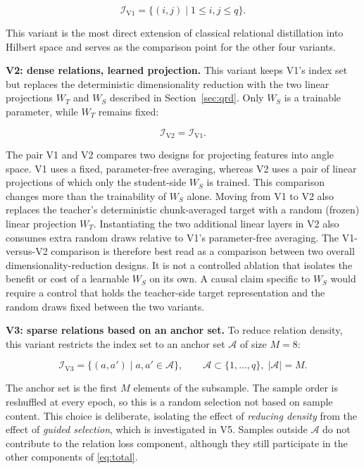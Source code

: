 \begin{equation}
\label{eq:i-v1}
\mathcal{I}_{\mathrm{V1}} = \{(i,j) \mid 1 \le i,j \le q\}.
\end{equation}

This variant is the most direct extension of classical relational
distillation into Hilbert space and serves as the comparison point
for the other four variants.

\textbf{V2: dense relations, learned projection.} This variant keeps
V1's index set but replaces the deterministic dimensionality
reduction with the two linear projections $W_T$ and $W_S$ described in Section~\ref{sec:qrd}. Only $W_S$ is a trainable parameter, while $W_T$ remains fixed:

\begin{equation}
\label{eq:i-v2}
\mathcal{I}_{\mathrm{V2}} = \mathcal{I}_{\mathrm{V1}}.
\end{equation}

The pair V1 and V2 compares two designs for projecting features into angle space. V1 uses a fixed, parameter-free averaging, whereas V2 uses a pair of linear projections of which only the student-side $W_S$ is trained. This comparison changes more than the trainability of $W_S$
alone. Moving from V1 to V2 also replaces the teacher's deterministic
chunk-averaged target with a random (frozen) linear projection
$W_T$. Instantiating the two additional linear layers in V2 also
consumes extra random draws relative to V1's parameter-free
averaging. The V1-versus-V2 comparison is therefore best read as a comparison between two overall dimensionality-reduction designs. It is not a controlled ablation that isolates the benefit or cost of a learnable $W_S$ on its own. A causal claim specific to $W_S$ would
require a control that holds the teacher-side target representation
and the random draws fixed between the two variants.

\textbf{V3: sparse relations based on an anchor set.} To reduce
relation density, this variant restricts the index set to an anchor
set $\mathcal{A}$ of size $M = 8$:

\begin{equation}
\label{eq:i-v3}
\mathcal{I}_{\mathrm{V3}} = \{(a,a') \mid a, a' \in \mathcal{A}\},
\qquad \mathcal{A} \subset \{1,\ldots,q\}, \; |\mathcal{A}| = M.
\end{equation}

The anchor set is the first $M$ elements of the subsample. The
sample order is reshuffled at every epoch, so this is a random
selection not based on sample content. This choice is deliberate, isolating the effect of
\emph{reducing density} from the effect of \emph{guided selection},
which is investigated in V5. Samples outside $\mathcal{A}$ do not
contribute to the relation loss component, although they still
participate in the other components of \eqref{eq:total}.

